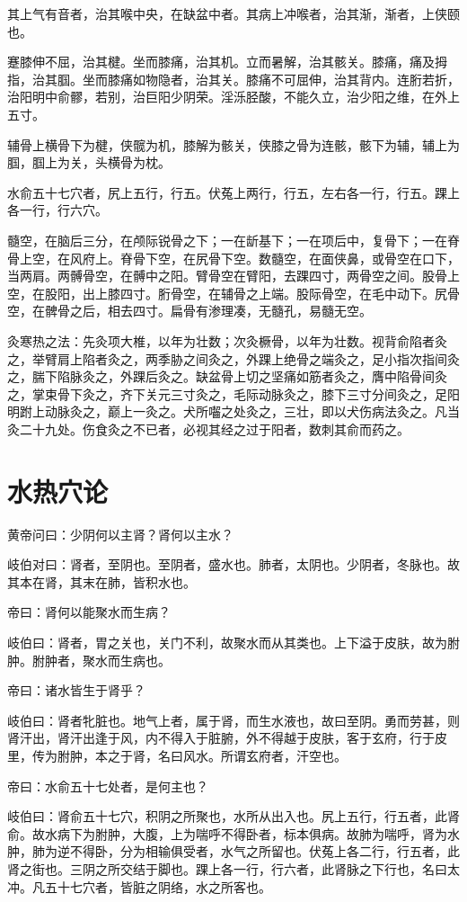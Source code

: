 \documentclass{article}%
\begin{document}
其上气有音者，治其喉中央，在缺盆中者。其病上冲喉者，治其渐，渐者，上侠颐也。

蹇膝伸不屈，治其楗。坐而膝痛，治其机。立而暑解，治其骸关。膝痛，痛及拇指，治其腘。坐而膝痛如物隐者，治其关。膝痛不可屈伸，治其背内。连胻若折，治阳明中俞髎，若别，治巨阳少阴荣。淫泺胫酸，不能久立，治少阳之维，在外上五寸。

辅骨上横骨下为楗，侠髋为机，膝解为骸关，侠膝之骨为连骸，骸下为辅，辅上为腘，腘上为关，头横骨为枕。

水俞五十七穴者，尻上五行，行五。伏菟上两行，行五，左右各一行，行五。踝上各一行，行六穴。

髓空，在脑后三分，在颅际锐骨之下；一在龂基下；一在项后中，复骨下；一在脊骨上空，在风府上。脊骨下空，在尻骨下空。数髓空，在面侠鼻，或骨空在口下，当两肩。两髆骨空，在髆中之阳。臂骨空在臂阳，去踝四寸，两骨空之间。股骨上空，在股阳，出上膝四寸。胻骨空，在辅骨之上端。股际骨空，在毛中动下。尻骨空，在髀骨之后，相去四寸。扁骨有渗理凑，无髓孔，易髓无空。

灸寒热之法：先灸项大椎，以年为壮数；次灸橛骨，以年为壮数。视背俞陷者灸之，举臂肩上陷者灸之，两季胁之间灸之，外踝上绝骨之端灸之，足小指次指间灸之，腨下陷脉灸之，外踝后灸之。缺盆骨上切之坚痛如筋者灸之，膺中陷骨间灸之，掌束骨下灸之，齐下关元三寸灸之，毛际动脉灸之，膝下三寸分间灸之，足阳明跗上动脉灸之，巅上一灸之。犬所囓之处灸之，三壮，即以犬伤病法灸之。凡当灸二十九处。伤食灸之不已者，必视其经之过于阳者，数刺其俞而药之。
\section{水热穴论}
黄帝问曰：少阴何以主肾？肾何以主水？

岐伯对曰：肾者，至阴也。至阴者，盛水也。肺者，太阴也。少阴者，冬脉也。故其本在肾，其末在肺，皆积水也。

帝曰：肾何以能聚水而生病？

岐伯曰：肾者，胃之关也，关门不利，故聚水而从其类也。上下溢于皮肤，故为胕肿。胕肿者，聚水而生病也。

帝曰：诸水皆生于肾乎？

岐伯曰：肾者牝脏也。地气上者，属于肾，而生水液也，故曰至阴。勇而劳甚，则肾汗出，肾汗出逢于风，内不得入于脏腑，外不得越于皮肤，客于玄府，行于皮里，传为胕肿，本之于肾，名曰风水。所谓玄府者，汗空也。

帝曰：水俞五十七处者，是何主也？

岐伯曰：肾俞五十七穴，积阴之所聚也，水所从出入也。尻上五行，行五者，此肾俞。故水病下为胕肿，大腹，上为喘呼不得卧者，标本俱病。故肺为喘呼，肾为水肿，肺为逆不得卧，分为相输俱受者，水气之所留也。伏菟上各二行，行五者，此肾之街也。三阴之所交结于脚也。踝上各一行，行六者，此肾脉之下行也，名曰太冲。凡五十七穴者，皆脏之阴络，水之所客也。
\end{document}

